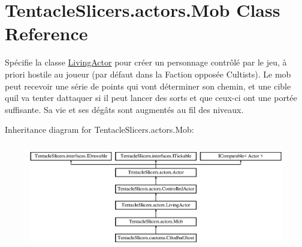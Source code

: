 \hypertarget{class_tentacle_slicers_1_1actors_1_1_mob}{}\section{Tentacle\+Slicers.\+actors.\+Mob Class Reference}
\label{class_tentacle_slicers_1_1actors_1_1_mob}


Spécifie la classe \hyperlink{class_tentacle_slicers_1_1actors_1_1_living_actor}{Living\+Actor} pour créer un personnage contrôlé par le jeu, à priori hostile au joueur (par défaut dans la Faction opposée Cultists). Le mob peut recevoir une série de points qui vont déterminer son chemin, et une cible qu\textquotesingle{}il va tenter d\textquotesingle{}attaquer si il peut lancer des sorts et que ceux-\/ci ont une portée suffisante. Sa vie et ses dégâts sont augmentés au fil des niveaux.  


Inheritance diagram for Tentacle\+Slicers.\+actors.\+Mob\+:\begin{figure}[H]
\begin{center}
\leavevmode
\includegraphics[height=4.686193cm]{class_tentacle_slicers_1_1actors_1_1_mob}
\end{center}
\end{figure}
